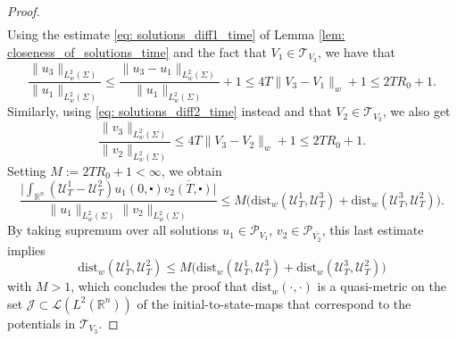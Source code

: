 \documentclass[10pt,a4paper]{amsart}
\newcommand{\R}{\mathbb{R}}
\def\cal{\mathcal}
\def\cd{\centerdot}
\newcommand{\dist}{\mathrm{dist}}
\def\ovl{\overline}
\begin{document}
\begin{proof}
\begin{align*}
\end{align*}
%
Using the estimate \eqref{eq: solutions_diff1_time} of Lemma \ref{lem: closeness_of_solutions_time} and the fact that $V_1\in\cal{T}_{V_3}$, we have that 
%
\[
\frac{\|u_3\|_{L^2_w(\Sigma)}}{\|u_1\|_{L^2_w(\Sigma)}} \leq \frac{\|u_3 - u_1\|_{L^2_w(\Sigma)}}{\|u_1\|_{L^2_w(\Sigma)}} + 1 
\leq 4T \| V_3 - V_1\|_w +1 
\leq  2T R_0 +1 .
\]
%
Similarly, using \eqref{eq: solutions_diff2_time} instead and that $V_2\in \cal{T}_{V_3}$, we also get 
%
\[
\frac{\|v_3\|_{L^2_w(\Sigma)}}{\|v_2\|_{L^2_w(\Sigma)}} \leq 4T \| V_3 - V_2 \|_w +1
\leq 2T R_0 +1.
\]
%
Setting $ M:=  2T R_0 +1 < \infty$, we obtain 
%
\[
\frac{\Big| \displaystyle \int_{\R^n} (\cal{U}^1_T -\cal{U}^2_T) u_1(0, \cd) \ovl{v_2(T, \cd)}\Big|}{\|u_1\|_{L^2_w(\Sigma)} \|v_2\|_{L^2_w(\Sigma)}} 
\leq M \Big( \dist_w(\cal{U}_T^1, \cal{U}_T^3) + \dist_w(\cal{U}_T^3, \cal{U}_T^2) \Big).
\]
%
By taking supremum over all solutions $u_1\in \cal{P}_{V_1}$, $v_2 \in \cal{P}_{\ovl{V_2}}$, this last estimate implies 
%
\[
\dist_w(\cal{U}_T^1, \cal{U}_T^2) \leq M \Big( \dist_w(\cal{U}_T^1, \cal{U}_T^3) + \dist_w(\cal{U}_T^3, \cal{U}_T^2) \Big)
\]
%
with $M > 1$, which concludes the proof that $\dist_w(\cdot, \cdot)$ is a quasi-metric on the set $\cal{J} \subset \cal{L}(L^2(\R^n))$ of the initial-to-state-maps that correspond to the potentials in $\cal{T}_{V_3}$. 
%
\end{proof}
\end{document}
